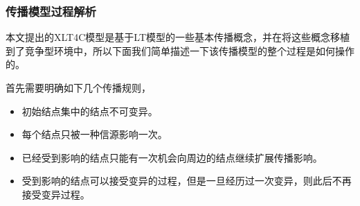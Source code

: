 \subsubsection{传播模型过程解析}
\label{sec:xlt4c:model-analysis}
本文提出的XLT4C模型是基于LT模型的一些基本传播概念，并在将这些概念移植到了竞争型环境中，所以下面我们简单描述一下该传播模型的整个过程是如何操作的。

首先需要明确如下几个传播规则，
\begin{itemize}
\label{list:rules-for-xtran}
\item 初始结点集中的结点不可变异。
\item 每个结点只被一种信源影响一次。
\item 已经受到影响的结点只能有一次机会向周边的结点继续扩展传播影响。
\item 受到影响的结点可以接受变异的过程，但是一旦经历过一次变异，则此后不再接受变异过程。
\end{itemize}


